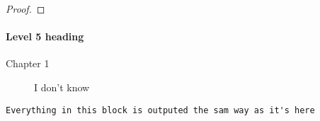 \begin{proof}

\end{proof}

\paragraph{Level 5 heading}

\begin{corollary}

\end{corollary}

\begin{proposition}

\end{proposition}

\begin{note}

\end{note}

\begin{remark}

\end{remark}

\begin{lemma}

\end{lemma}

\begin{description}
	\item[Chapter 1] I don't know
\end{description}

\begin{listing} %
	\begin{verbatim}
Everything in this block is outputed the sam way as it's here
\end{verbatim}
	\caption{}
	\label{}
\end{listing}

